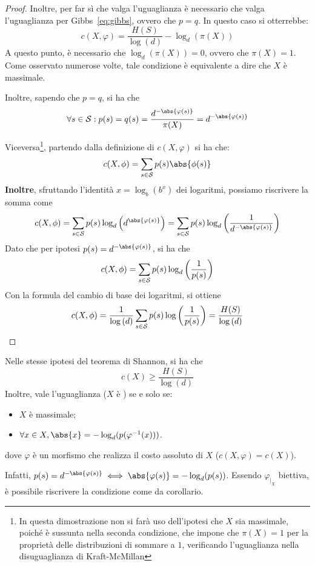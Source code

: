 \begin{proof}
  Inoltre, per far sì che valga l'uguaglianza è necessario che valga l'uguaglianza per Gibbs~\eqref{eq:gibbs}, ovvero che \(p = q\).
  In questo caso si otterrebbe:
  \[c(X,\varphi) = \frac{H(S)}{\log\left(d\right)} - \log_{d}(\pi(X))\]
  A questo punto, è necessario che \(\log_{d}(\pi(X)) = 0\), ovvero che \(\pi(X) = 1\). Come osservato numerose volte, tale condizione è equivalente a dire che \(X\) è massimale.

  Inoltre, sapendo che \(p = q\), si ha che
  \[\forall s \in \SCal: p(s) = q(s) = \frac{d^{-\abs{\varphi(s)}}}{\pi(X)} = d^{-\abs{\varphi(s)}}\]

  Viceversa\footnote{In questa dimostrazione non si farà uso dell'ipotesi che \(X\) sia massimale, poiché è sussunta nella seconda condizione, che impone che \(\pi(X) = 1\) per la proprietà delle distribuzioni di sommare a \(1\), verificando l'uguaglianza nella disuguaglianza di Kraft-McMillan}, partendo dalla definizione di \(c(X,\varphi)\) si ha che:
  \[c(X,\phi) = \sum_{s \in \SCal} p(s)\abs{\phi(s)}\]
  \textbf{Inoltre}, sfruttando l'identità \(x = \log_{b}(b^x)\) dei logaritmi, possiamo riscrivere la somma come
  \[c(X,\phi) = \sum_{s \in \SCal} p(s)\log_{d}\left(d^{\abs{\varphi(s)}}\right) =\sum_{s \in \SCal} p(s)\log_{d}\left(\frac{1}{d^{-\abs{\varphi(s)}}}\right) \]
  Dato che per ipotesi \(p(s) = d^{-\abs{\varphi(s)}}\), si ha che
  \[c(X,\phi) = \sum_{s \in \mathcal{S}} p(s)\log_{d}\left(\frac{1}{p(s)}\right) \]
  Con la formula del cambio di base dei logaritmi, si ottiene
  \[c(X,\phi) = \frac{1}{\log\left(d\right)} \sum_{s \in \mathcal{S}} p(s)\log\left(\frac{1}{p(s)}\right) = \frac{H(S)}{\log\left(d\right)}\]
\end{proof}

\begin{corollary}{}
  Nelle stesse ipotesi del teorema di Shannon, si ha che
  \[c(X) \geq \frac{H(S)}{\log(d)}\]
  Inoltre, vale l'uguaglianza (\(X\) è ) se e solo se:
  \begin{itemize}
    \item \(X\) è massimale;
    \item \(\forall x \in X, \abs{x} = -\log_d (p(\varphi^{-1}(x)))\).
  \end{itemize}
  dove \(\varphi\) è un morfismo che realizza il costo assoluto di \(X\) (\(c(X,\varphi) = c(X)\)).
\end{corollary}
Infatti, \(p(s) = d^{-\abs{\varphi(s)}} \iff \abs{\varphi(s)} = -\log_d(p(s))\). Essendo \(\varphi_{|_X}\) biettiva, è possibile riscrivere la condizione come da corollario.

